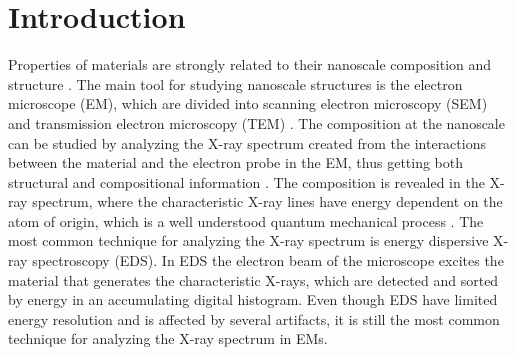\chapter{Introduction}
\label{chap:introduction}



%  
%  






Properties of materials are strongly related to their nanoscale composition and structure \cite{callister2014materials}.
The main tool for studying nanoscale structures is the electron microscope (EM), which are divided into scanning electron microscopy (SEM) and transmission electron microscopy (TEM) \cite{goldstein_scanning_2018,williams_carter_tem_2009}.
The composition at the nanoscale can be studied by analyzing the X-ray spectrum created from the interactions between the material and the electron probe in the EM, thus getting both structural and compositional information \cite{jenkins_xrayspectroscopy}.
The composition is revealed in the X-ray spectrum, where the characteristic X-ray lines have energy dependent on the atom of origin, which is a well understood quantum mechanical process \cite{hollas_modern_2004,goldstein_scanning_2018}.
The most common technique for analyzing the X-ray spectrum is energy dispersive X-ray spectroscopy (EDS).
In EDS the electron beam of the microscope excites the material that generates the characteristic X-rays, which are detected and sorted by energy in an accumulating digital histogram.
Even though EDS have limited energy resolution and is affected by several artifacts, it is still the most common technique for analyzing the X-ray spectrum in EMs.

